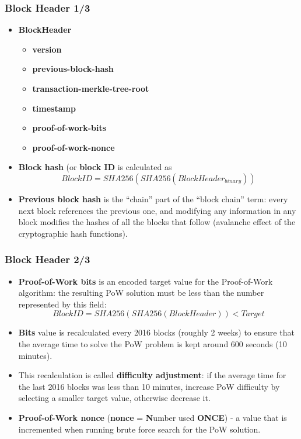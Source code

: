 \documentclass{beamer}
\begin{document}
\begin{frame}
  \frametitle{Block Header 1/3}
  \begin{itemize}
  \item \textbf{BlockHeader}
    \begin{itemize}
    \item \textbf{version}
    \item \textbf{previous-block-hash}
    \item \textbf{transaction-merkle-tree-root}
    \item \textbf{timestamp}
    \item \textbf{proof-of-work-bits}
    \item \textbf{proof-of-work-nonce}
    \end{itemize}
  \item \textbf{Block hash} (or \textbf{block ID} is calculated as
    $$BlockID = SHA256(SHA256(BlockHeader_{binary}))$$
  \item \textbf{Previous block hash} is the ``chain'' part of the ``block
    chain'' term: every next block references the previous one, and modifying
    any information in any block modifies the hashes of all the blocks that
    follow (avalanche effect of the cryptographic hash functions).
  \end{itemize}
\end{frame}

\begin{frame}
  \frametitle{Block Header 2/3}
  \begin{itemize}
  \item \textbf{Proof-of-Work bits} is an encoded target value for the
    Proof-of-Work algorithm: the resulting PoW solution must be less than the
    number represented by this field:
    $$ BlockID = SHA256(SHA256(BlockHeader)) < Target$$
  \item \textbf{Bits} value is recalculated every 2016 blocks (roughly 2 weeks)
    to ensure that the average time to solve the PoW problem is kept around 600
    seconds (10 minutes).
  \item This recalculation is called \textbf{difficulty adjustment}: if the
    average time for the last 2016 blocks was less than 10 minutes, increase PoW
    difficulty by selecting a smaller target value, otherwise decrease it.
  \item \textbf{Proof-of-Work nonce} (\textbf{nonce} = \textbf{N}umber used
    \textbf{ONCE}) - a value that is incremented when running brute force search
    for the PoW solution.
  \end{itemize}
\end{frame}
\end{document}
